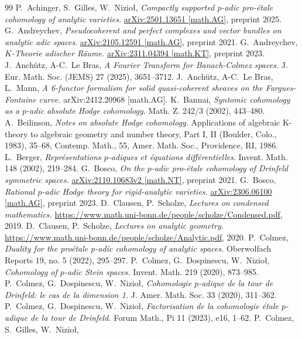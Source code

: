 \documentclass[10pt,reqno]{amsart}
\theoremstyle{definition}
\theoremstyle{remark}
\numberwithin{equation}{section}
\numberwithin{equation}{section}
\begin{document}
\begin{thebibliography}{99}
 P.~Achinger, S.~Gilles, W.~Nizio\l, 
{\em Compactly supported $p$-adic pro-\'etale cohomology of analytic varieties.}
\url{arXiv:2501.13651 [math.AG]}, preprint 2025.
 G.~Andreychev, 
{\em Pseudocoherent and perfect complexes and vector bundles on analytic adic spaces}. 
\url{arXiv:2105.12591 [math.AG]}, preprint 2021.
 G.~Andreychev, {\em $K$-Theorie adischer R\"aume.}
\url{arXiv:2311.04394 [math.KT]}, preprint 2023.
 J.~Anch\"utz, A-C.~Le Bras, {\em  A Fourier Transform for Banach-Colmez spaces.} J. Eur. Math. Soc. (JEMS) 27 (2025), 3651--3712.
 J.~Anch\"utz, A-C.~Le Bras, L.~Mann, {\em A 6-functor formalism for solid quasi-coherent sheaves on the Fargues-Fontaine curve.} arXiv:2412.20968 [math.AG].
 K.~Bannai, {\em Syntomic cohomology as a $p$-adic absolute Hodge cohomology}. Math. Z. 242/3 (2002), 443--480.
 A.~Beilinson, {\em Notes on absolute Hodge cohomology}. Applications of algebraic K-theory to algebraic geometry and
number theory, Part I, II (Boulder, Colo., 1983), 35--68, Contemp. Math., 55, Amer. Math. Soc., Providence, RI,
1986.
 L.~Berger, 
{\em Repr\'esentations $p$-adiques et \'equations diff\'erentielles}. Invent. Math. 148 (2002), 219--284.
 G.~Bosco, {\em On the $p$-adic pro-\'etale cohomology of Drinfeld symmetric spaces.}  
\url{arXiv:2110.10683v2 [math.NT]}, preprint 2021. 
 G.~Bosco, {\em Rational $p$-adic Hodge theory for rigid-analytic varieties.}  	
\url{arXiv:2306.06100 [math.AG]}, preprint 2023.
 D.~Clausen, P.~Scholze, {\em Lectures on condensed mathematics.} 
\url{https://www.math.uni-bonn.de/people/scholze/Condensed.pdf}, 2019.
 D.~Clausen, P.~Scholze, {\em Lectures on analytic geometry.} 
\url{https://www.math.uni-bonn.de/people/scholze/Analytic.pdf}, 2020.
 P.~Colmez,  {\it Duality for the pro\'etale $p$-adic cohomology of analytic spaces.}
Oberwolfach Reports  19, no. 5 (2022), 295--297.
 P.~Colmez, G.~Dospinescu, W.~Nizio\l, {\em Cohomology of $p$-adic Stein spaces.} Invent. Math. 219 (2020), 873--985.
 P.~Colmez, G.~Dospinescu, W.~Nizio\l, {\em Cohomologie $p$-adique de la tour de Drinfeld: le cas de la dimension 1.} J. Amer. Math. Soc. 33 (2020), 311--362.
 P.~Colmez, G.~Dospinescu, W.~Nizio\l, {\em Factorisation de la cohomologie \'etale $p$-adique de la tour de Drinfeld.} Forum Math., Pi 11 (2023), e16, 1--62.
 P.~Colmez, S.~Gilles, W.~Nizio\l,

\end{thebibliography}
\end{document}
